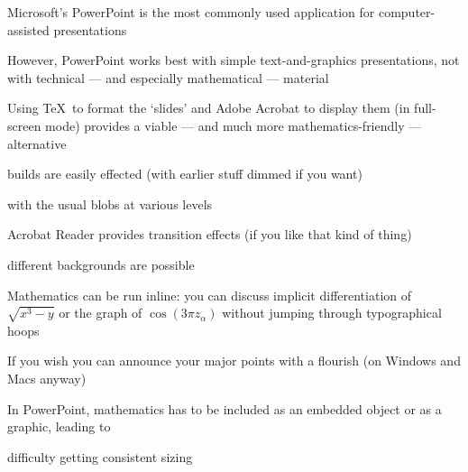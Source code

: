 \begin{slide}
\color{Uwhite}\pagecolor{black} %
 


\Build Microsoft's PowerPoint is the most commonly used
application for computer-assisted presentations

\Build However, PowerPoint works best with simple text-and-graphics
presentations\Build, not with technical --- and especially
mathematical --- material

\newslide\DimmingOn{}
\BackgroundOverlay{} %
Using \TeX\ to format the `slides' and Adobe Acrobat to display them
(in full-screen mode) provides a viable --- and much more
mathematics-friendly --- alternative

\Blob[transition=Dissolve] builds are easily effected\hb
{\scriptsize(with earlier stuff dimmed if you want)}

\Bblob[transition=Dissolve] with the usual blobs at various levels

\Bbblob[transition=Dissolve] Acrobat Reader provides transition effects
{\scriptsize(if you like that kind of thing)}

\newslide{}
\blob different backgrounds are possible

\Blob Mathematics can be run inline: \Build you can
discuss implicit differentiation of $\sqrt{x^3- y}$
or the graph of $\cos(3\pi z_\alpha)$ without
jumping through typographical hoops

\vfil
\Build[sound=whistle1]
If you wish you can announce your major points with a flourish
{\scriptsize (on Windows and Macs anyway)}

\DimmingOff
\newslide{}

\blob In PowerPoint, mathematics has to be included as
an embedded object or as a graphic\Build, leading to

\blob difficulty getting consistent sizing


\end{slide}
